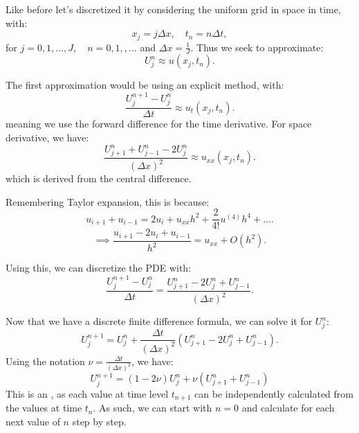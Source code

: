 \documentclass[../main/main.tex]{subfiles}
\begin{document}
Like before let's discretized it by considering the uniform grid in space in time, with: \[
x_j = j \Delta x, \quad t_n = n \Delta t
,\] for $j=0,1,\ldots,J, \quad n = 0,1,,\ldots$ and $\Delta x = \frac{1}{J}$. Thus we seek to approximate: \[
U_j^{n} \approx u(x_j, t_n)
.\] 

The first approximation would be using an explicit method, with: \[
    \frac{U_j^{n+1}-U_j^n}{\Delta t} \approx u_t(x_j,t_n)
.\] meaning we use the forward difference for the time derivative. For space derivative, we have: \[
\frac{U_{j+1}^{n}+U_{j-1}^{n}-2U_{j}^{n}}{(\Delta x)^2} \approx u_{x x } (x_j,t_n)
.\] which is derived from the central difference.
\begin{remark}
   Remembering Taylor expansion, this is because: \[
       u_{i+1} + u_{i-1} = 2u_i + u_{x x} h^2 + \frac{2}{4!} u^{(4)}h^{4} + \ldots
   .\]  \[
   \implies \frac{u_{i+1}-2u_i+u_{i-1}}{h^2} = u_{x x } + O(h^2)
   .\] 
\end{remark}

Using this, we can discretize the PDE with: \[
    \frac{U_j^{n+1}-U_j^{n}}{\Delta t} = \frac{U_{j+1}^{n}-2U_j^{n}+U_{j-1}^{n}}{(\Delta x)^2}
.\] 

Now that we have a discrete finite difference formula, we can solve it for $U_j^n$: \[
    U_j^{n+1} = U_j^n + \frac{\Delta t}{(\Delta x)^2} \left( U_{j+1}^{n}-2U_j^n + U^n_{j-1} \right) 
    .\] Using the notation $\nu = \frac{\Delta t}{\left( \Delta x\right) ^2}$, we have: \begin{equation}
    \label{9_10_Ujn}
U^{n+1}_j = (1-2\nu)U_j^n + \nu \left( U_{j+1}^n + U_{j-1} ^n\right) 
\end{equation} This is an , as each value at time level $t_{n+1}$ can be independently calculated from the values at time $t_n$. As such, we can start with  $n=0$ and calculate for each next value of  $n$ step by step.
\end{document}
